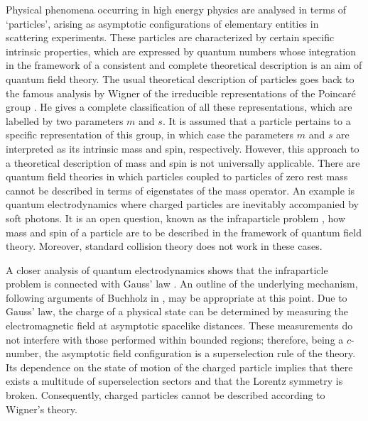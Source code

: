 \documentclass[11pt,twoside,openright]{report}
\theoremstyle{definition}
\theoremstyle{plain}
\theoremstyle{remark}
\theoremstyle{assumption}
\begin{document}
Physical phenomena occurring in high energy physics are analysed in
terms of `particles', arising as asymptotic configurations of
elementary entities in scattering experiments. These particles are
characterized by certain specific intrinsic properties, which are
expressed by quantum numbers whose integration in the framework of a
consistent and complete theoretical description is an aim of quantum
field theory. The usual theoretical description of particles goes back
to the famous analysis by Wigner of the irreducible representations of
the Poincar\'{e} group \cite{wigner:1939}. He gives a complete
classification of all these representations, which are labelled by two
parameters $m$ and $s$. It is assumed that a particle pertains to a
specific representation of this group, in which case the parameters
$m$ and $s$ are interpreted as its intrinsic mass and spin,
respectively. However, this approach to a theoretical description of
mass and spin is not universally applicable. There are quantum field
theories in which particles coupled to particles of zero rest mass
cannot be described in terms of eigenstates of the mass operator. An
example is quantum electrodynamics where charged particles are
inevitably accompanied by soft photons. It is an open question, known
as the infraparticle problem \cite{schroer:1963}, how mass and spin of
a particle are to be described in the framework of quantum field
theory. Moreover, standard collision theory does not work in these
cases.

A closer analysis of quantum electrodynamics shows that the
infraparticle problem is connected with Gauss' law
\cite{froehlich/morchio/strocchi:1979,buchholz:1986a}. An outline of 
the underlying  mechanism, following arguments of Buchholz in
\cite{buchholz:1986a}, may be appropriate at this point. Due to Gauss'
law, the charge of a physical state can be determined by measuring the
electromagnetic field at asymptotic spacelike distances. These
measurements do not interfere with those performed within bounded
regions; therefore, being a $c$-number, the asymptotic field
configuration is a superselection rule of the theory. Its dependence
on the state of motion of the charged particle implies that there
exists a multitude of superselection sectors and that the Lorentz
symmetry is broken. Consequently, charged particles cannot be
described according to Wigner's theory.
\end{document}
